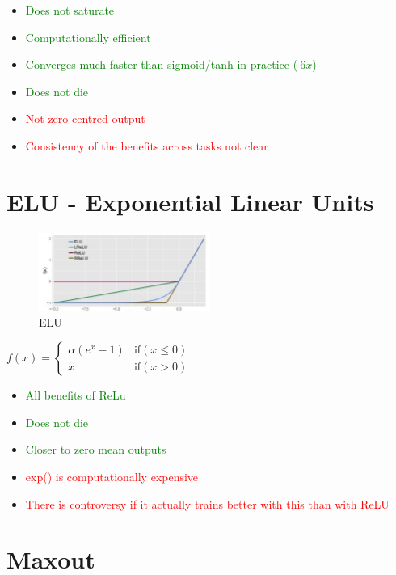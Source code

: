 \begin{itemize}
\item \textcolor{green}{Does not saturate}
\item \textcolor{green}{Computationally efficient}
\item \textcolor{green}{Converges much faster than sigmoid/tanh in practice ($~6x$)}
\item \textcolor{green}{Does not die}

\item \textcolor{red}{Not zero centred output}
\item \textcolor{red}{Consistency of the benefits across tasks not clear}
\end{itemize}

\section{ELU - Exponential Linear Units}

\begin{figure}[!htb]
  \centering
  \includegraphics[width=0.5\textwidth]{Images/activation_f/6.png}
  \caption{ELU}
\end{figure}
$f(x) = \left\{\begin{matrix}
\alpha(e^x-1) & \text{if}(x\leq 0)\\ 
x & \text{if}(x>  0)
\end{matrix}\right.$
\begin{itemize}
\item \textcolor{green}{All benefits of ReLu}
\item \textcolor{green}{Does not die}
\item \textcolor{green}{Closer to zero mean outputs}

\item \textcolor{red}{exp() is computationally expensive}
\item \textcolor{red}{There is controversy if it actually trains better with this than with ReLU}
\end{itemize}

\section{Maxout}

